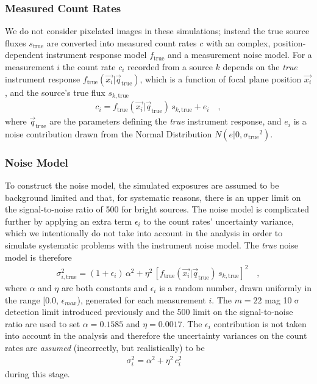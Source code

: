\documentclass[manuscript]{aastex}
\newcommand{\true}{\text{true}}
\begin{document}
\subsubsection{Measured Count Rates}
We do not consider pixelated images in these simulations; instead the true source fluxes $s_\true$ are converted into measured count rates $c$ with an complex, position-dependent instrument response model $f_\true$ and a measurement noise model. For a measurement $i$ the count rate $c_i$ recorded from a source $k$ depends on the \textit{true} instrument response $f_{\true}(\vec{x_i} | \vec{q}_\true)$, which is a function of focal plane position $\vec{x_i}$, and the source's true flux $s_{k,\true}$ 
\begin{eqnarray*}
c_i = f_{\true}(\vec{x_i} | \vec{q}_\true) \, s_{k, \true} + e_{i} \quad ,
\end{eqnarray*}
where $\vec{q}_\true$ are the parameters defining the \textit{true} instrument response, and $e_i$ is a noise contribution drawn from the Normal Distribution $N(e|0,{\sigma_\true}^2)$. 

\subsubsection{Noise Model}
\label{sec:noise}
To construct the noise model, the simulated exposures are assumed to be background limited and that, for systematic reasons, there is an upper limit on the signal-to-noise ratio of 500 for bright sources. The noise model is complicated further by applying an extra term $\epsilon_i$ to the count rates' uncertainty variance, which we intentionally do not take into account in the analysis in order to simulate systematic problems with the instrument noise model. The \textit{true} noise model is therefore
\begin{eqnarray}
\sigma_{i, \true}^{2} = (1 + \epsilon_i) \, \alpha^{2} + \eta^{2}\, [ f_\true(\vec{x_i} | \vec{q}_\true) \, s_{k, \true} ]^2 \quad , \label{eqn:noise}
\end{eqnarray}
where $\alpha$ and $\eta$ are both constants and $\epsilon_i$ is a random number, drawn uniformly in the range [0.0, $\epsilon_{max}$), generated for each measurement $i$. The $m = 22$ mag 10$\upsigma$ detection limit introduced previously and the 500 limit on the signal-to-noise ratio are used to set $\alpha = 0.1585$ and $\eta = 0.0017$. The $\epsilon_i$ contribution is not taken into account in the analysis and therefore the uncertainty variances on the count rates are \textit{assumed} (incorrectly, but realistically) to be
\begin{eqnarray*}
\sigma_{{i}}^{2} = \alpha^{2} + \eta^{2} \, c^{2}_i \quad 
\end{eqnarray*}
during this stage. 
\end{document}

